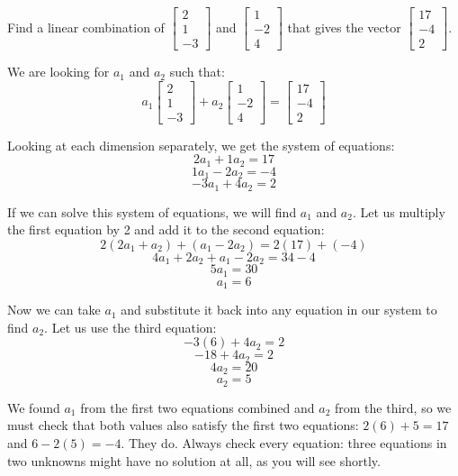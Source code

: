 \begin{Worked}
\begin{Problem}
Find a linear combination of
$\begin{bmatrix} 2 \\ 1 \\ -3 \end{bmatrix}$ and 
$\begin{bmatrix} 1 \\ -2 \\ 4 \end{bmatrix}$ 
that gives the vector 
$\begin{bmatrix} 17 \\ -4 \\ 2 \end{bmatrix}$.
\end{Problem}
\begin{Solution}
We are looking for $a_1$ and $a_2$ such that:
$$
a_1 \begin{bmatrix} 2 \\ 1 \\ -3 \end{bmatrix}
+ 
a_2 \begin{bmatrix} 1 \\ -2 \\ 4 \end{bmatrix}
=
\begin{bmatrix} 17 \\ -4 \\ 2 \end{bmatrix}
$$

Looking at each dimension separately, we get the system of equations:
$$2 a_1 + 1 a_2 = 17$$
$$1 a_1 - 2 a_2 = -4$$
$$-3 a_1 + 4 a_2 = 2$$

If we can solve this system of equations, we will find $a_1$ and $a_2$. Let us 
multiply the first equation by 2 and add it to the second equation:
$$
2 \left( 2 a_1 + a_2 \right)
+
\left( a_1 - 2 a_2 \right)
=
2(17) + (-4)
$$
$$4 a_1 + 2 a_2 + a_1 - 2 a_2 = 34 - 4$$
$$5 a_1 = 30$$
$$a_1 = 6$$

Now we can take $a_1$ and substitute it back into any equation in our system 
to find $a_2$. Let us use the third equation:
$$-3(6) + 4 a_2 = 2$$
$$-18 + 4 a_2 = 2$$
$$4 a_2 = 20$$
$$a_2 = 5$$

We found $a_1$ from the first two equations combined and $a_2$ from the
third, so we must check that both values also satisfy the first two
equations: $2(6) + 5 = 17$ and $6 - 2(5) = -4$. They do. Always check
every equation: three equations in two unknowns might have no solution at
all, as you will see shortly.


\end{Solution}
\end{Worked}

